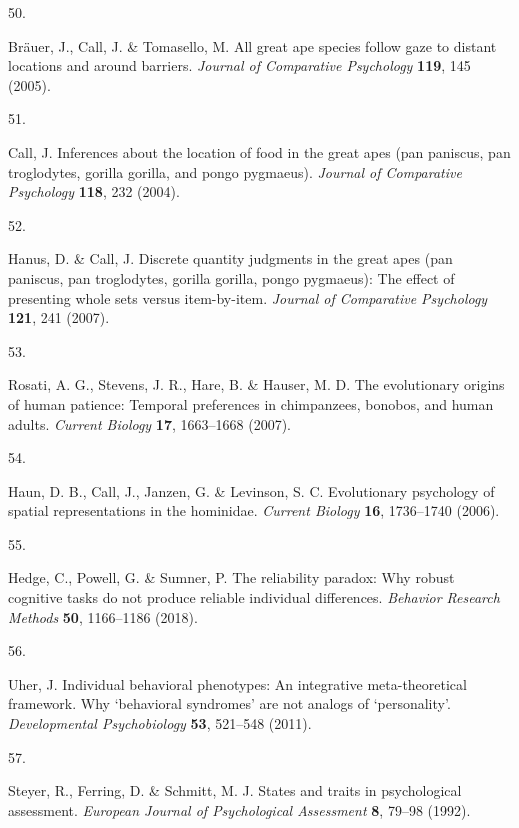 \documentclass[
  man,floatsintext]{apa6}
\newlength{\cslhangindent}
\newlength{\csllabelwidth}
\newlength{\cslentryspacingunit} %
\newenvironment{CSLReferences}[2] %
 {%
  \setlength{\parindent}{0pt}
  \ifodd #1
  \let\oldpar\par
  \def\par{\hangindent=\cslhangindent\oldpar}
  \fi
  \setlength{\parskip}{#2\cslentryspacingunit}
 }%
 {}
\newcommand{\CSLLeftMargin}[1]{\parbox[t]{\csllabelwidth}{#1}}
\newcommand{\CSLRightInline}[1]{\parbox[t]{\linewidth - \csllabelwidth}{#1}\break}
\begin{document}
\begin{CSLReferences}{0}{0}
\leavevmode{}%
\CSLLeftMargin{50. }%
\CSLRightInline{Bräuer, J., Call, J. \& Tomasello, M. All great ape species follow gaze to distant locations and around barriers. \emph{Journal of Comparative Psychology} \textbf{119}, 145 (2005).}

\leavevmode{}%
\CSLLeftMargin{51. }%
\CSLRightInline{Call, J. Inferences about the location of food in the great apes (pan paniscus, pan troglodytes, gorilla gorilla, and pongo pygmaeus). \emph{Journal of Comparative Psychology} \textbf{118}, 232 (2004).}

\leavevmode{}%
\CSLLeftMargin{52. }%
\CSLRightInline{Hanus, D. \& Call, J. Discrete quantity judgments in the great apes (pan paniscus, pan troglodytes, gorilla gorilla, pongo pygmaeus): The effect of presenting whole sets versus item-by-item. \emph{Journal of Comparative Psychology} \textbf{121}, 241 (2007).}

\leavevmode{}%
\CSLLeftMargin{53. }%
\CSLRightInline{Rosati, A. G., Stevens, J. R., Hare, B. \& Hauser, M. D. The evolutionary origins of human patience: Temporal preferences in chimpanzees, bonobos, and human adults. \emph{Current Biology} \textbf{17}, 1663--1668 (2007).}

\leavevmode{}%
\CSLLeftMargin{54. }%
\CSLRightInline{Haun, D. B., Call, J., Janzen, G. \& Levinson, S. C. Evolutionary psychology of spatial representations in the hominidae. \emph{Current Biology} \textbf{16}, 1736--1740 (2006).}

\leavevmode{}%
\CSLLeftMargin{55. }%
\CSLRightInline{Hedge, C., Powell, G. \& Sumner, P. The reliability paradox: Why robust cognitive tasks do not produce reliable individual differences. \emph{Behavior Research Methods} \textbf{50}, 1166--1186 (2018).}

\leavevmode{}%
\CSLLeftMargin{56. }%
\CSLRightInline{Uher, J. Individual behavioral phenotypes: An integrative meta-theoretical framework. Why {`behavioral syndromes'} are not analogs of {`personality'}. \emph{Developmental Psychobiology} \textbf{53}, 521--548 (2011).}

\leavevmode{}%
\CSLLeftMargin{57. }%
\CSLRightInline{Steyer, R., Ferring, D. \& Schmitt, M. J. States and traits in psychological assessment. \emph{European Journal of Psychological Assessment} \textbf{8}, 79--98 (1992).}


\end{CSLReferences}
\end{document}
